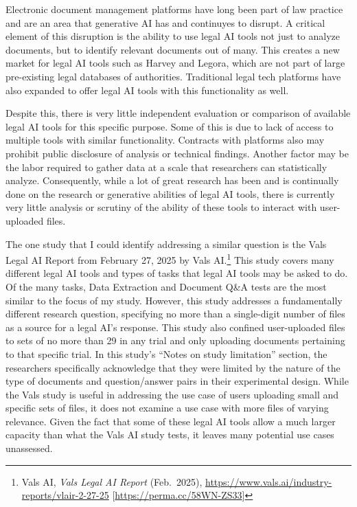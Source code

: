 \documentclass[
]{article}
\begin{document}
Electronic document management platforms have long been part of law practice and are an area that generative AI has and continuyes to disrupt. A critical element of this disruption is the ability to use legal AI tools not just to analyze documents, but to identify relevant documents out of many. This creates a new market for legal AI tools such as Harvey and Legora, which are not part of large pre-existing legal databases of authorities. Traditional legal tech platforms have also expanded to offer legal AI tools with this functionality as well.

Despite this, there is very little independent evaluation or comparison of available legal AI tools for this specific purpose. Some of this is due to lack of access to multiple tools with similar functionality. Contracts with platforms also may prohibit public disclosure of analysis or technical findings. Another factor may be the labor required to gather data at a scale that researchers can statistically analyze. Consequently, while a lot of great research has been and is continually done on the research or generative abilities of legal AI tools, there is currently very little analysis or scrutiny of the ability of these tools to interact with user-uploaded files.

The one study that I could identify addressing a similar question is the Vals Legal AI Report from February 27, 2025 by Vals AI.\footnote{Vals AI, \emph{Vals Legal AI Report} (Feb.~2025), \url{https://www.vals.ai/industry-reports/vlair-2-27-25} {[}\url{https://perma.cc/58WN-ZS33}{]}} This study covers many different legal AI tools and types of tasks that legal AI tools may be asked to do. Of the many tasks, Data Extraction and Document Q\&A tests are the most similar to the focus of my study. However, this study addresses a fundamentally different research question, specifying no more than a single-digit number of files as a source for a legal AI's response. This study also confined user-uploaded files to sets of no more than 29 in any trial and only uploading documents pertaining to that specific trial. In this study's ``Notes on study limitation'' section, the researchers specifically acknowledge that they were limited by the nature of the type of documents and question/answer pairs in their experimental design. While the Vals study is useful in addressing the use case of users uploading small and specific sets of files, it does not examine a use case with more files of varying relevance. Given the fact that some of these legal AI tools allow a much larger capacity than what the Vals AI study tests, it leaves many potential use cases unassessed.
\end{document}
